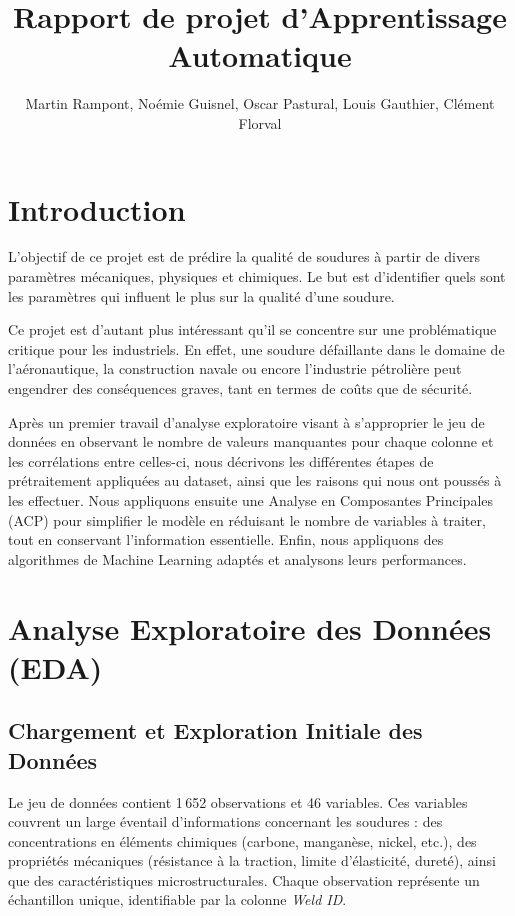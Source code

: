 \documentclass{article}
\title{Rapport de projet d'Apprentissage Automatique}
\author{Martin Rampont, Noémie Guisnel, Oscar Pastural, Louis Gauthier, Clément Florval}
\begin{document}
\maketitle

\section{Introduction}

L'objectif de ce projet est de prédire la qualité de soudures à partir de divers paramètres mécaniques, physiques et chimiques. Le but est d'identifier quels sont les paramètres qui influent le plus sur la qualité d'une soudure.

Ce projet est d'autant plus intéressant qu'il se concentre sur une problématique critique pour les industriels. En effet, une soudure défaillante dans le domaine de l'aéronautique, la construction navale ou encore l'industrie pétrolière peut engendrer des conséquences graves, tant en termes de coûts que de sécurité.

Après un premier travail d'analyse exploratoire visant à s’approprier le jeu de données en observant le nombre de valeurs manquantes pour chaque colonne et les corrélations entre celles-ci, nous décrivons les différentes étapes de prétraitement appliquées au dataset, ainsi que les raisons qui nous ont poussés à les effectuer. Nous appliquons ensuite une Analyse en Composantes Principales (ACP) pour simplifier le modèle en réduisant le nombre de variables à traiter, tout en conservant l’information essentielle. Enfin, nous appliquons des algorithmes de Machine Learning adaptés et analysons leurs performances.

\section{Analyse Exploratoire des Données (EDA)}

\subsection{Chargement et Exploration Initiale des Données}

Le jeu de données contient 1\,652 observations et 46 variables. Ces variables couvrent un large éventail d'informations concernant les soudures : des concentrations en éléments chimiques (carbone, manganèse, nickel, etc.), des propriétés mécaniques (résistance à la traction, limite d’élasticité, dureté), ainsi que des caractéristiques microstructurales. Chaque observation représente un échantillon unique, identifiable par la colonne \textit{Weld ID}.
\end{document}
